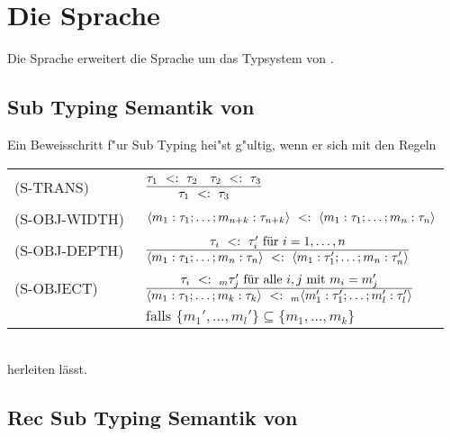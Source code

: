 \section{Die Sprache \LTWOOSUB}
Die Sprache \LTWOOSUB erweitert die Sprache \LTWOSUB um das Typsystem von \LTWOO. 

\subsection{Sub Typing Semantik von \LTWOOSUB}

Ein Beweisschritt f"ur Sub Typing hei"st g"ultig, wenn er sich mit den Regeln  \\[5mm]
  \begin{tabular}{ll}
    \mbox{(S-TRANS)\ }      & $\RULE{\subtype{\tau_1} {\tau_2} \quad \subtype{\tau_2} {\tau_3}}
                              {\subtype{\tau_1} {\tau_3}}$ \\[4mm]
    \mbox{(S-OBJ-WIDTH)\ }  & $\langle m_1:\tau_1;\ldots;m_{n+k}:\tau_{n+k}\rangle\ <:\ \langle m_1:\tau_1;\ldots;m_n:\tau_n\rangle$ \\[2mm]
    \mbox{(S-OBJ-DEPTH)\ }  & $\RULE{\subtype{\tau_i} {\tau_i'} \text{ f\"ur } i=1,\ldots,n}
                              {\subtype{\typeObject{m_1:\tau_1;\ldots;m_n:\tau_n}}
                               {\typeObject{m_1:\tau_1';\ldots;m_n:\tau_n'}}}$ \\[5mm]
    \mbox{(S-OBJECT)\ }    & $\RULE{\subtype{\tau_i} {_m \tau_j'} \text{ f\"ur alle } i,j \text{ mit } m_i = m_j'}
                              {\subtype{\typeObject{m_1:\tau_1;\ldots;m_k:\tau_k}}
                               {_m \typeObject{m_1':\tau_1';\ldots;m_l':\tau_l'}}}$ \\[4mm]
                      & $\text{falls } \{m_1',\ldots,m_l'\} \subseteq \{m_1,\ldots,m_k\}$
  \end{tabular} \\[7mm]

herleiten l\"asst.

\subsection{Rec Sub Typing Semantik von \LTWOOSUB} 

